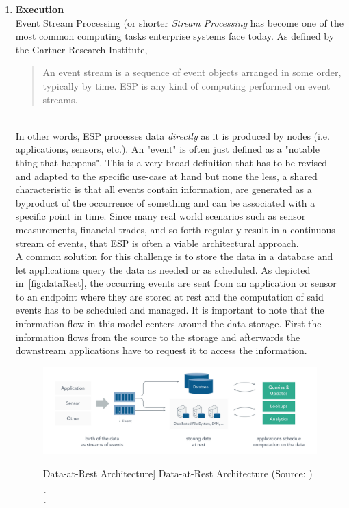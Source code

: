 \begin{enumerate}
    \item
    \textbf{Execution}\\
    Event Stream Processing (or shorter \textit{Stream Processing} has become one of the most common computing tasks enterprise systems face today. As defined by the Gartner Research Institute,
    \blockquote{An event stream is a sequence of event objects arranged in some order, typically by time. \acf{ESP} is any kind of computing performed on event streams.}\autocite{Schulte2017TechnologyProcessing}\\
    In other words, \acf{ESP} processes data \textit{directly} as it is produced by nodes (i.e. applications, sensors, etc.). An "event" is often just defined as a "notable thing that happens".\autocite{Group2006Event-DrivenOverview} This is a very broad definition that has to be revised and adapted to the specific use-case at hand but none the less, a shared characteristic is that all events contain information, are generated as a byproduct of the occurrence of something and can be associated with a specific point in time. 
    Since many real world scenarios such as sensor measurements, financial trades, and so forth regularly result in a continuous stream of events, that \acf{ESP} is often a viable architectural approach.\\
    A common solution for this challenge is to store the data in a database and let applications query the data as needed or as scheduled. As depicted in~\vref{fig:dataRest}, the occurring events are sent from an application or sensor to an endpoint where they are stored at rest and the computation of said events has to be scheduled and managed. It is important to note that the information flow in this model centers around the data storage. First the information flows from the source to the storage and afterwards the downstream applications have to request it to access the information.
    
    \begin{figure}[ht]
        \includegraphics[width=\linewidth]{images/streaming/data_at_rest.png}\centering
        \caption
        [Data-at-Rest Architecture]
        {Data-at-Rest Architecture (Source: \cite{dataArtisans2017WhatProcessing})}
        \label{fig:dataRest}
    \end{figure}
    

\end{enumerate}
